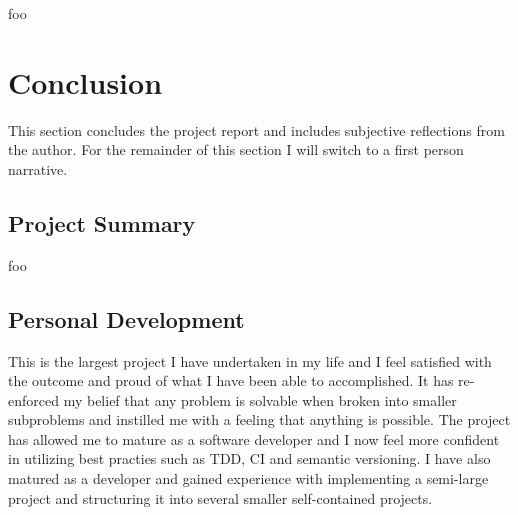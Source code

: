 \documentclass[12pt, a4paper]{article}
\begin{document}




foo

\pagebreak


\section{Conclusion}

This section concludes the project report and includes subjective reflections from the author. For the remainder of this section I will switch to a first person narrative.


\subsection{Project Summary}


foo


\subsection{Personal Development}

This is the largest project I have undertaken in my life and I feel satisfied with the outcome and proud of what I have been able to accomplished. It has re-enforced my belief that any problem is solvable when broken into smaller subproblems and instilled me with a feeling that anything is possible. The project has allowed me to mature as a software developer and I now feel more confident in utilizing best practies such as TDD, CI and semantic versioning. I have also matured as a developer and gained experience with implementing a semi-large project and structuring it into several smaller self-contained projects.

\end{document}

